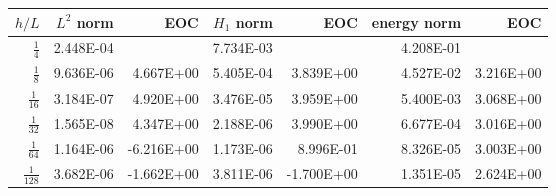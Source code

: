 \begin{table}
  \begin{tabular}{rrrrrrr}
    \hline\hline
    \textbf{$h/{L} $} & \textbf{$L^2$ norm} & \textbf{EOC} & \textbf{$H_1$ norm} & \textbf{EOC} & \textbf{energy norm} & \textbf{EOC} \\\hline
    $\frac{1}{4}$ & 2.448E-04 &  & 7.734E-03 &  & 4.208E-01 &  \\
    $\frac{1}{8}$ & 9.636E-06 & 4.667E+00 & 5.405E-04 & 3.839E+00 & 4.527E-02 & 3.216E+00 \\
    $\frac{1}{16}$ & 3.184E-07 & 4.920E+00 & 3.476E-05 & 3.959E+00 & 5.400E-03 & 3.068E+00 \\
    $\frac{1}{32}$ & 1.565E-08 & 4.347E+00 & 2.188E-06 & 3.990E+00 & 6.677E-04 & 3.016E+00 \\
    $\frac{1}{64}$ & 1.164E-06 & -6.216E+00 & 1.173E-06 & 8.996E-01 & 8.326E-05 & 3.003E+00 \\
    $\frac{1}{128}$ & 3.682E-06 & -1.662E+00 & 3.811E-06 & -1.700E+00 & 1.351E-05 & 2.624E+00 \\\hline\hline
  \end{tabular}
\end{table}
